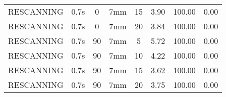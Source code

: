 \begin{table}[H]
\begin{tabular}{|c||c|c|c|c||c|c|c|}
RESCANNING & 0.7s & 0 & 7mm & 15 & 3.90 & 100.00 & 0.00 \\
RESCANNING & 0.7s & 0 & 7mm & 20 & 3.84 & 100.00 & 0.00 \\
RESCANNING & 0.7s & 90 & 7mm & 5 & 5.72 & 100.00 & 0.00 \\
RESCANNING & 0.7s & 90 & 7mm & 10 & 4.22 & 100.00 & 0.00 \\
RESCANNING & 0.7s & 90 & 7mm & 15 & 3.62 & 100.00 & 0.00 \\
RESCANNING & 0.7s & 90 & 7mm & 20 & 3.75 & 100.00 & 0.00 \\
    \hline\hline 
  \end{tabular}
  \label{tab:Pat07_LPV}
\end{table}

\newpage
\thispagestyle{realempty}
\vspace*{-2cm}

